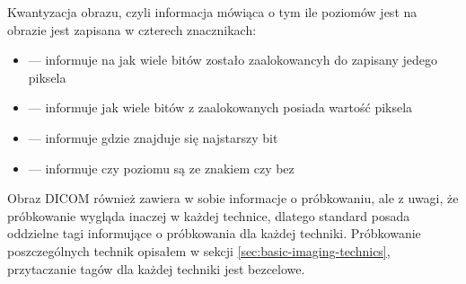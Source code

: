 \par
Kwantyzacja obrazu, czyli informacja mówiąca o tym ile poziomów jest na obrazie jest zapisana w czterech znacznikach:
\begin{itemize}
    \item {} --- informuje na jak wiele bitów zostało zaalokowancyh do zapisany jedego piksela
    \item {} --- informuje jak wiele bitów z zaalokowanych posiada wartość piksela
    \item {} --- informuje gdzie znajduje się najstarszy bit
    \item {} --- informuje czy poziomu są ze znakiem czy bez
\end{itemize}

\par
Obraz DICOM również zawiera w sobie informacje o próbkowaniu, ale z uwagi, że próbkowanie wygląda inaczej w każdej technice, dlatego standard posada oddzielne tagi informujące o próbkowania dla każdej techniki.
Próbkowanie poszczególnych technik opisałem w sekcji \ref{sec:basic-imaging-technics}, przytaczanie tagów dla każdej techniki jest bezcelowe.







